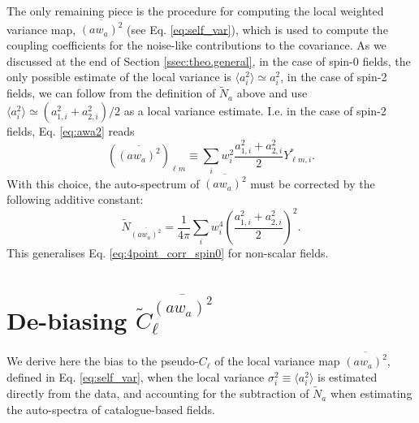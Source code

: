 \documentclass[%
 reprint,
superscriptaddress,
nofootinbib,
 amsmath,amssymb,
 aps,
 prd,
]{revtex4-2}
\begin{document}
  The only remaining piece is the procedure for computing the local weighted variance map, $\overline{(aw_a)^2}$ (see Eq. \ref{eq:self_var}), which is used to compute the coupling coefficients for the noise-like contributions to the covariance. As we discussed at the end of Section \ref{ssec:theo.general}, in the case of spin-0 fields, the only possible estimate of the local variance is $\langle a_i^2\rangle\simeq a_i^2$, in the case of spin-2 fields, we can follow from the definition of $\tilde{N}_a$ above and use $\langle a_i^2\rangle\simeq(a_{1,i}^2+a_{2,i}^2)/2$ as a local variance estimate. I.e. in the case of spin-2 fields, Eq. \ref{eq:awa2} reads
  \begin{equation}
      \left(\overline{(aw_a)^2}\right)_{\ell m}\equiv\sum_iw_i^2\frac{a_{1,i}^2+a_{2,i}^2}{2}Y_{\ell m,i}^*.
  \end{equation}
  With this choice, the auto-spectrum of $\overline{(aw_a)^2}$ must be corrected by the following additive constant:
  \begin{equation}
    \tilde{N}_{\overline{(aw_a)^2}}=\frac{1}{4\pi}\sum_iw_i^4\left(\frac{a_{1,i}^2+a_{2,i}^2}{2}\right)^2.
  \end{equation}
  This generalises Eq. \ref{eq:4point_corr_spin0} for non-scalar fields.

\section{De-biasing \texorpdfstring{$\tilde{C}_\ell^{\overline{(aw_a)^2}}$}{the field-variance PCL}}\label{app:awa2_shotnoise}
  We derive here the bias to the pseudo-$C_\ell$ of the local variance map $\overline{(aw_a)^2}$, defined in Eq. \ref{eq:self_var}, when the local variance $\sigma_i^2\equiv \langle a_i^2\rangle$ is estimated directly from the data, and accounting for the subtraction of $\tilde{N}_a$ when estimating the auto-spectra of catalogue-based fields.
\end{document}
